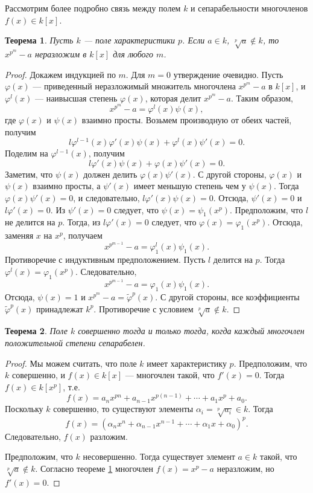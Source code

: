 \documentclass[12pt, titlepage, oneside]{amsbook}
\newtheorem{theorem}{Теорема}[chapter]
\theoremstyle{definition}
\theoremstyle{remark}
\begin{document}
Рассмотрим более подробно связь между полем $k$ и сепарабельности многочленов $f(x)\in k[x]$.

\begin{theorem}
\label{Sov2}
Пусть $k$ --- поле характеристики $p$. Если $a\in k$, $\sqrt[p]{a}\not\in k$, то $x^{p^m}-a$ неразложим в $k[x]$ для любого $m$.
\end{theorem}

\begin{proof}
Докажем индукцией по $m$. Для $m=0$ утверждение очевидно. Пусть $\varphi(x)$ --- приведенный неразложимый множитель многочлена $x^{p^m}-a$ в $k[x]$, и $\varphi^l(x)$  --- наивысшая степень $\varphi(x)$, которая делит $x^{p^m}-a$. Таким образом, $$x^{p^m}-a=\varphi^l(x)\psi(x),$$ где $\varphi(x)$ и $\psi(x)$ взаимно просты. Возьмем производную от обеих частей, получим $$l\varphi^{l-1}(x)\varphi'(x)\psi(x)+\varphi^l(x)\psi'(x)=0.$$ Поделим на $\varphi^{l-1}(x)$, получим $$l\varphi'(x)\psi(x)+\varphi(x)\psi'(x)=0.$$ Заметим, что $\psi(x)$ должен делить $\varphi(x)\psi'(x)$. С другой стороны, $\varphi(x)$ и $\psi(x)$ взаимно просты, а $\psi'(x)$ имеет меньшую степень чем у $\psi(x)$. Тогда $\varphi(x)\psi'(x)=0$, и следовательно, $l\varphi'(x)\psi(x)=0$. Отсюда, $\psi'(x)=0$ и $l\varphi'(x)=0$. Из $\psi'(x)=0$ следует, что $\psi(x)=\psi_1(x^p)$. Предположим, что $l$ не делится на $p$. Тогда, из $l\varphi'(x)=0$ следует, что $\varphi(x)=\varphi_1(x^p)$. Отсюда, заменяя $x$ на $x^p$, получаем $$x^{p^{m-1}}-a=\varphi^l_1(x)\psi_1(x).$$ Противоречие с индуктивным предположением. Пусть $l$ делится на $p$. Тогда $\varphi^l(x)=\varphi_1(x^p)$. Следовательно, $$x^{p^{m-1}}-a=\varphi_1(x)\psi_1(x).$$ Отсюда, $\psi(x)=1$ и $x^{p^m}-a=\tilde{\varphi}^p(x)$. С другой стороны, все коэффициенты $\tilde{\varphi}^p(x)$ принадлежат $k^p$. Противоречие с условием $\sqrt[p]{a}\not\in k$.
\end{proof}

\begin{theorem}
\label{Sov3}
Поле $k$ совершенно тогда и только тогда, когда каждый многочлен положительной степени сепарабелен.
\end{theorem}

\begin{proof}
Мы можем считать, что поле $k$ имеет характеристику $p$. Предположим, что $k$ совершенно, и $f(x)\in k[x]$ --- многочлен такой, что $f'(x)=0$. Тогда $f(x)\in k[x^p]$, т.е. $$f(x)=a_nx^{pn}+a_{n-1}x^{p(n-1)}+\cdots+a_1x^p+a_0.$$ Поскольку $k$ совершенно, то существуют элементы $\alpha_i=\sqrt[p]{a_i}\in k$. Тогда $$f(x)=(\alpha_nx^{n}+\alpha_{n-1}x^{n-1}+\cdots+\alpha_1x+\alpha_0)^p.$$ Следовательно, $f(x)$ разложим.

Предположим, что $k$ несовершенно. Тогда существует элемент $a\in k$ такой, что $\sqrt[p]{a}\not\in k$. Согласно теореме \ref{Sov2} многочлен $f(x)=x^p-a$ неразложим, но $f'(x)=0$.
\end{proof}
\end{document}
